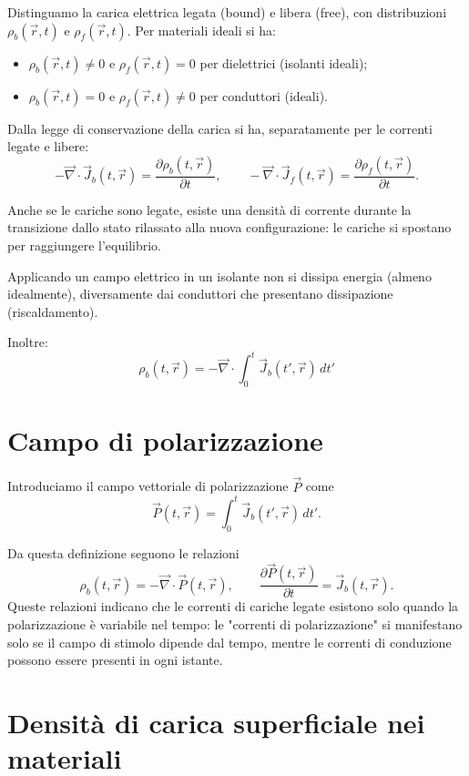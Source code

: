 \documentclass{book}
\begin{document}
Distinguamo la carica elettrica legata (bound) e libera (free), con distribuzioni $\rho_b(\vec{r},t)$ e $\rho_f(\vec{r},t)$. Per materiali ideali si ha:
\begin{itemize}
    \item $\rho_b(\vec{r},t)\neq 0$ e $\rho_f(\vec{r},t)=0$ per dielettrici (isolanti ideali);
    \item $\rho_b(\vec{r},t)=0$ e $\rho_f(\vec{r},t)\neq 0$ per conduttori (ideali).
\end{itemize}

Dalla legge di conservazione della carica si ha, separatamente per le correnti legate e libere:
\[
-\vec{\nabla}\cdot\vec{J}_b(t,\vec{r}) = \frac{\partial\rho_b(t,\vec{r})}{\partial t},\qquad -\vec{\nabla}\cdot\vec{J}_f(t,\vec{r}) = \frac{\partial\rho_f(t,\vec{r})}{\partial t}.
\]

Anche se le cariche sono legate, esiste una densità di corrente durante la transizione dallo stato rilassato alla nuova configurazione: le cariche si spostano per raggiungere l'equilibrio. 

Applicando un campo elettrico in un isolante non si dissipa energia (almeno idealmente), diversamente dai conduttori che presentano dissipazione (riscaldamento). 

Inoltre:
\[
\rho_b(t, \vec{r}) = -\vec{\nabla} \cdot \int_0^t \vec{J}_b(t', \vec{r}) \, dt'
\]


\section{Campo di polarizzazione}

Introduciamo il campo vettoriale di polarizzazione $\vec{P}$ come
\[
\vec{P}(t,\vec{r}) = \int_0^t \vec{J}_b(t',\vec{r})\,dt'.
\]

Da questa definizione seguono le relazioni
\[
\rho_b(t,\vec{r}) = -\vec{\nabla}\cdot\vec{P}(t,\vec{r}), \qquad \frac{\partial\vec{P}(t,\vec{r})}{\partial t} = \vec{J}_b(t,\vec{r}).
\]
Queste relazioni indicano che le correnti di cariche legate esistono solo quando la polarizzazione \`e variabile nel tempo: le "correnti di polarizzazione" si manifestano solo se il campo di stimolo dipende dal tempo, mentre le correnti di conduzione possono essere presenti in ogni istante.

\section{Densit\`a di carica superficiale nei materiali}
\end{document}
